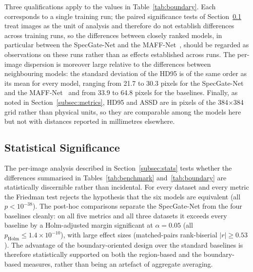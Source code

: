 Three qualifications apply to the values in Table~\ref{tab:boundary}. Each corresponds to a single training run; the paired significance tests of Section~\ref{subsec:statsig} treat images as the unit of analysis and therefore do not establish differences across training runs, so the differences between closely ranked models, in particular between the SpecGate-Net and the MAFF-Net~\cite{ref15}, should be regarded as observations on these runs rather than as effects established across runs. The per-image dispersion is moreover large relative to the differences between neighbouring models: the standard deviation of the HD95 is of the same order as its mean for every model, ranging from 21.7 to 30.3 pixels for the SpecGate-Net and the MAFF-Net~\cite{ref15} and from 33.9 to 64.8 pixels for the baselines. Finally, as noted in Section~\ref{subsec:metrics}, HD95 and ASSD are in pixels of the 384$\times$384 grid rather than physical units, so they are comparable among the models here but not with distances reported in millimetres elsewhere.

\subsection{Statistical Significance}
\label{subsec:statsig}

The per-image analysis described in Section~\ref{subsec:stats} tests whether the differences summarised in Tables~\ref{tab:benchmark} and~\ref{tab:boundary} are statistically discernible rather than incidental. For every dataset and every metric the Friedman test rejects the hypothesis that the six models are equivalent (all $p<10^{-38}$). The post-hoc comparisons separate the SpecGate-Net from the four baselines cleanly: on all five metrics and all three datasets it exceeds every baseline by a Holm-adjusted margin significant at $\alpha=0.05$ (all $p_{\mathrm{Holm}}\le 1.4\times10^{-10}$), with large effect sizes (matched-pairs rank-biserial $\lvert r\rvert\ge 0.53$). The advantage of the boundary-oriented design over the standard baselines is therefore statistically supported on both the region-based and the boundary-based measures, rather than being an artefact of aggregate averaging.

